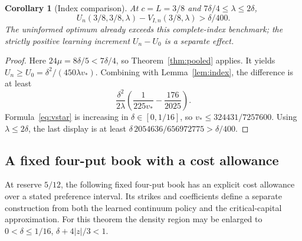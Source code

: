 \documentclass[11pt,a4paper]{amsart}
\theoremstyle{plain}
\newtheorem{corollary}[theorem]{Corollary}
\theoremstyle{definition}
\theoremstyle{remark}
\begin{document}
\begin{corollary}[Index comparison]\label{cor:indexgap}
At $c=L=3/8$ and $7\delta/4\le\lambda\le2\delta$,
\begin{equation}\label{eq:indexgap}
 U_n(3/8,3/8,\lambda)-V_{I,n}(3/8,\lambda)>\delta/400.
\end{equation}
The uninformed optimum already exceeds this complete-index benchmark; the strictly positive learning increment $U_n-U_0$ is a separate effect.
\end{corollary}
\begin{proof}
Here $24\mu=8\delta/5<7\delta/4$, so Theorem~\ref{thm:pooled} applies. It yields $U_n\ge U_0=\delta^2/(450\lambda v_*)$. Combining with Lemma~\ref{lem:index}, the difference is at least
\[
 \frac{\delta^2}{2\lambda}\left(\frac1{225v_*}-\frac{176}{2025}\right).
\]
Formula~\eqref{eq:vstar} is increasing in $\delta\in[0,1/16]$, so $v_*\le324431/7257600$. Using $\lambda\le2\delta$, the last display is at least
$\delta\,2054636/656972775>\delta/400$.
\end{proof}

\subsection{A fixed four-put book with a cost allowance}
At reserve $5/12$, the following fixed four-put book has an explicit cost allowance over a stated preference interval. Its strikes and coefficients define a separate construction from both the learned continuum policy and the critical-capital approximation. For this theorem the density region may be enlarged to $0<\delta\le1/16$, $\delta+4|z|/3<1$.
\end{document}
